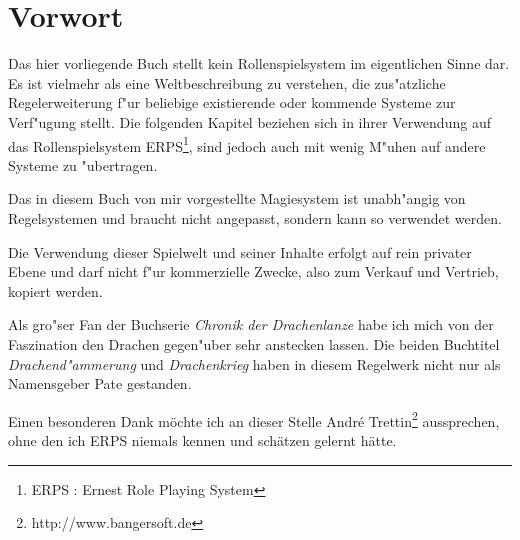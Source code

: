 \section*{Vorwort}
\par Das hier vorliegende Buch stellt kein Rollenspielsystem im eigentlichen
Sinne dar. Es ist vielmehr als eine Weltbeschreibung zu verstehen,
die zus"atzliche Regelerweiterung f"ur beliebige existierende oder
kommende Systeme zur Verf"ugung stellt. Die folgenden Kapitel
beziehen sich in ihrer Verwendung auf das Rollenspielsystem
ERPS\footnote{ERPS : Ernest Role Playing System}, sind jedoch auch
mit wenig M"uhen auf andere Systeme zu "ubertragen.
\par Das in diesem Buch von mir vorgestellte Magiesystem ist unabh"angig von Regelsystemen und braucht nicht angepasst, sondern kann so verwendet werden.
\par Die Verwendung dieser Spielwelt und seiner Inhalte erfolgt auf rein privater Ebene und darf nicht f"ur kommerzielle Zwecke, also zum Verkauf und Vertrieb, kopiert werden.
\par Als gro"ser Fan der Buchserie \textit{Chronik der Drachenlanze} habe ich mich von der Faszination den Drachen gegen"uber sehr anstecken lassen. Die beiden Buchtitel \textit{Drachend"ammerung}\cite{cdd6} und \textit{Drachenkrieg}\cite{cdd5} haben in diesem Regelwerk nicht nur als Namensgeber Pate gestanden.
\par Einen besonderen Dank möchte ich an dieser Stelle André Trettin\footnote{http://www.bangersoft.de} aussprechen, ohne den ich ERPS niemals kennen und schätzen gelernt hätte.
